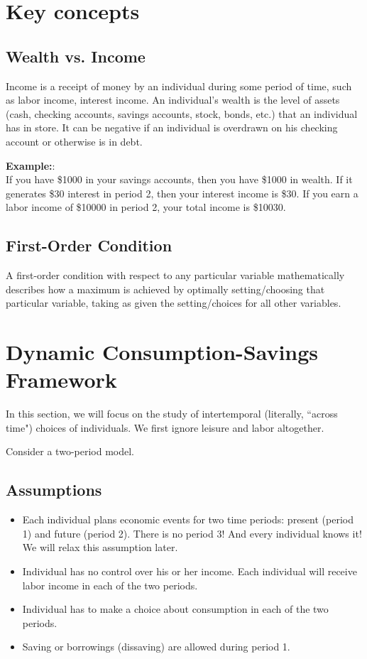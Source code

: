 \documentclass[10pt]{article}
\title{}
\author{}
\date{}
\begin{document}
\maketitle

\section{Key concepts}
\subsection{Wealth vs. Income}
Income is a receipt of money by an individual during some period of time, such as labor income, 
interest income.
An individual's wealth is the level of assets (cash, checking accounts, savings accounts, stock, 
bonds, etc.) that an individual has in store. It can be negative if an individual is overdrawn
on his checking account or otherwise is in debt.

{\textbf {Example:}}:\\
If you have \$1000 in your savings accounts, then you have \$1000 in wealth.
If it generates \$30 interest in period 2, then your interest income is \$30.
If you earn a labor income of \$10000 in period 2, your total income is \$10030.

\subsection{First-Order Condition}
A first-order condition with respect to any particular variable mathematically describes how
a maximum is achieved by optimally setting/choosing that particular variable, taking as given the
setting/choices for all other variables.



\section{Dynamic Consumption-Savings Framework}
In this section, we will focus on the study of intertemporal (literally, ``across time")
choices of individuals.
We first ignore  leisure and labor altogether.

Consider a two-period model.

\subsection{Assumptions}
\begin{itemize}
\item 
		Each individual plans economic events for two time periods: present (period 1) and future 
		(period 2). There is no period 3! And every individual knows it!
		We will relax this assumption later.
\item 
		Individual has no control over his or her income. Each individual will receive labor income
		in each of the two periods. 
\item 
		Individual has to make a choice about consumption in each of the two periods.
\item
		Saving or borrowings (dissaving) are allowed during period 1.
\end{itemize}
\end{document}
